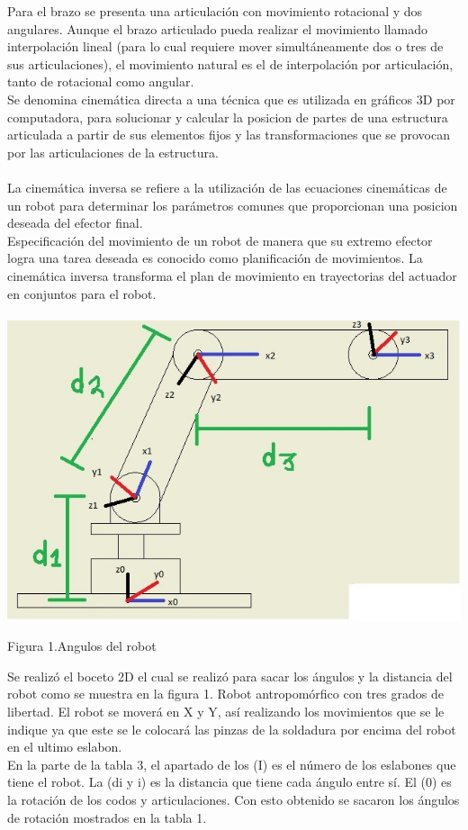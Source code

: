\documentclass[12pt,letterpaper]{article}
\begin{document}
Para el brazo se presenta una articulación con movimiento rotacional y dos angulares. Aunque el brazo articulado pueda realizar el movimiento llamado interpolación lineal (para lo cual requiere mover simultáneamente dos o tres de sus articulaciones), el movimiento natural es el de interpolación por articulación, tanto de rotacional como angular.
\\
Se denomina cinemática directa a una técnica que es utilizada en gráficos 3D por computadora, para solucionar y calcular la posicion de partes de una estructura articulada a partir de sus elementos fijos y las transformaciones que se provocan por las articulaciones de la estructura.
\\\\
La cinemática inversa se refiere a la utilización de las ecuaciones cinemáticas de un robot
para determinar los parámetros comunes que proporcionan una posicion deseada del efector
final.
\\
Especificación del movimiento de un robot de manera que su extremo efector logra una
tarea deseada es conocido como planificación de movimientos. La cinemática inversa transforma el plan de movimiento en trayectorias del actuador en conjuntos para el robot.
\\\\
\includegraphics[scale=1]{imag6.jpg} 
\begin{center}
Figura 1.Angulos del robot
\end{center}
Se realizó el boceto 2D el cual se realizó para sacar los ángulos y la distancia del robot como se muestra en la figura 1.
Robot antropomórfico con tres grados de libertad. El robot se moverá en X y Y, así realizando los movimientos que se le indique ya que este se le colocará las pinzas de la soldadura por encima del robot en el ultimo eslabon.
\\
En la parte de la tabla 3, el apartado de los (I) es el número de los eslabones que tiene el robot. La (di y i) es la distancia que tiene cada ángulo entre sí. El (0) es la rotación de los codos y articulaciones.
Con esto obtenido se sacaron los ángulos de rotación mostrados en la tabla 1.
\end{document}
